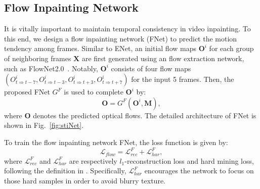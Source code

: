 \subsection{Flow Inpainting Network}

It is vitally important to maintain temporal consistency in video inpainting.
To this end, we design a flow inpainting network (FNet) to predict the motion tendency among frames.
%
Similar to ENet, an initial flow maps \(\boldsymbol{O}^i\) for each group of neighboring frames $\boldsymbol{X}$ are first generated using an flow extraction network, such as FlowNet2.0~\cite{Flownet_2017_CVPR}.
Notably, \(\boldsymbol{O}^i\) consists of four flow maps \((O^i_{t\Rightarrow t-7}, O^i_{t\Rightarrow t-3}, O^i_{t\Rightarrow t+3}, O^i_{t\Rightarrow t+7})\) for the input 5 frames.
Then, the proposed FNet $G^F$ is used to complete \(\boldsymbol{O}^i\) by:
\begin{equation}
\label{eq:flownet}
\boldsymbol{O}=G^F(\boldsymbol{O}^{i},\boldsymbol{M}),
\end{equation}
where $\boldsymbol{O}$ denotes the predicted optical flows.
%
The detailed architecture of FNet is shown in Fig.~\ref{fig:stiNet}.

To train the flow inpainting network FNet, the loss function is given by:
\begin{equation}
\label{eq:flow_all}
\mathcal{L}_{flow}=\mathcal{L}^F_{rec}+ \mathcal{L}^F_{har},
\end{equation}
where $\mathcal{L}^F_{rec}$ and $\mathcal{L}^F_{har}$ are respectively $l_1$-reconstruction loss and hard mining loss, following the definition in \cite{Xu_2019_CVPR}. 
Specifically, $\mathcal{L}^F_{har}$ encourages the network to focus on those hard samples in order to avoid blurry texture.

%

